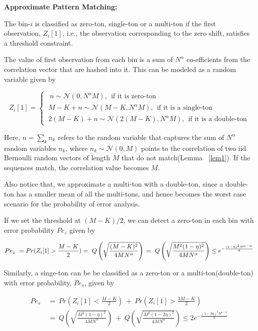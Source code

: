 {\bf Approximate Pattern Matching: } 
 
 The bin-$i$ is classified as zero-ton, single-ton or a multi-ton if the first observation, $Z_{i}[1]$, i.e., the observation corresponding to the zero shift, satisfies a threshold constraint. 

The value of first observation from each bin is a sum of $N^\alpha$ co-efficients from the correlation vector that are hashed into it. This can be modeled as a random variable given by


	
\[
Z_{i}[1] = \left\{
\begin{array}{ll}
\ \ n \sim \mathcal{N}(0,N^\alpha M) , \ \ \text{if it is zero-ton} \\
\ M-K + n  \sim \mathcal{N}(M - K,N^\alpha M) , \ \ \text{if it is a single-ton}\\
\ 2(M-K) + n  \sim \mathcal{N}(2(M - K),N^\alpha M) , \ \ \text{if it is a double-ton}
\end{array}
\right. 
\]


Here, $n = \sum_k n_k$ refers to the random variable that captures the sum of $N^\alpha$ random variables $n_k$, where $n_k \sim \mathcal{N}(0,M)$ points to the correlation of two iid Bernoulli random vectors of length $M$ that do not match(Lemma ~\ref{lem1}). If the sequences match, the correlation value becomes $M$.  

Also notice that, we approximate a multi-ton with a double-ton, since a double-ton has a smaller mean of all the multi-tons, and hence becomes the worst case scenario for the probability of error analysis.


If we set the threshold at $(M-K)/2$, we can detect a zero-ton in each bin with error probability $Pe_{z}$ given by

\[ 
Pe_{z} \ = Pr(Z_i[1]> \frac{M-K}{2}) =\ Q \left ( \sqrt{\frac{(M-K)^2}{4 M N^{\alpha}}} \right ) \\
           = \ Q \left ( \sqrt{\frac{M^2(1-\eta)^2}{4 M N^{\alpha}}} \right ) \leq e^{- \frac{(1-\eta)^2N^{\mu-\alpha}}{8}}
\]

Similarly, a singe-ton can be be classified as a zero-ton or a multi-ton(double-ton) with error probability, $Pe_{s}$, given by

\[ 
\begin{array}{ll}
 Pe_{s} \  &= \   Pr( Z_i[1] < \frac{M-K}{2}) \  + \ Pr( Z_i[1] > \frac{3M-K}{2}) \\
          &= \   Q \left ( \sqrt{\frac{M^2(1-\eta)^2}{4 M N^{\alpha}}}\right) \ + \ Q \left ( \sqrt{\frac{M^2(1-2\eta)^2}{4 M N^{\alpha}}} \right ) \leq 2 e^{- \frac{(1-2\eta)^2N^{\mu-\alpha}}{8}}
\end{array}
\]

